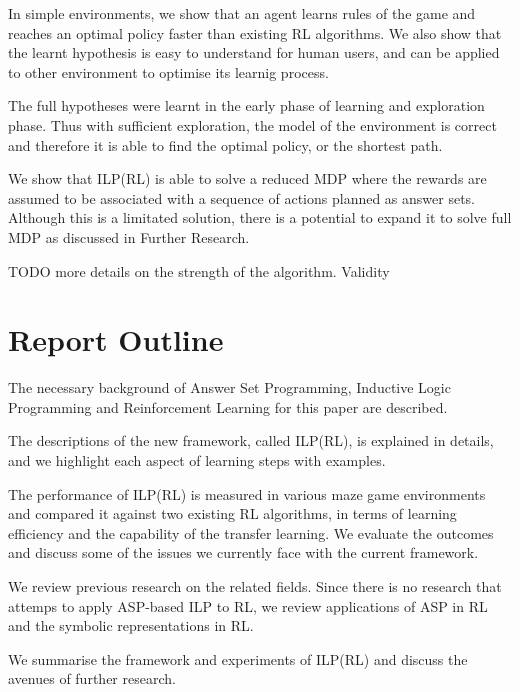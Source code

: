 In simple environments, we show that an agent learns rules of the game and reaches an optimal policy faster than existing RL algorithms.
We also show that the learnt hypothesis is easy to understand for human users, and can be applied to other environment to optimise its learnig process.

The full hypotheses were learnt in the early phase of learning and exploration phase. Thus with sufficient exploration, the model of the environment is correct
and therefore it is able to find the optimal policy, or the shortest path. 

We show that ILP(RL) is able to solve a reduced MDP where the rewards are assumed to be associated with a sequence of actions planned as answer sets.
Although this is a limitated solution, there is a potential to expand it to solve full MDP as discussed in Further Research. 

TODO more details on the strength of the algorithm. 
Validity

\section{Report Outline}
\begin{customthm}{2}
The necessary background of Answer Set Programming, Inductive Logic Programming and Reinforcement Learning for this paper are described.
\end{customthm}

\begin{customthm}{3}
The descriptions of the new framework, called ILP(RL), is explained in details, and we highlight each aspect of learning steps with examples. 
\end{customthm}

\begin{customthm}{4}
The performance of ILP(RL) is measured in various maze game environments and compared it against two existing RL algorithms, in terms of learning efficiency and the capability of the transfer learning.
We evaluate the outcomes and discuss some of the issues we currently face with the current framework.
\end{customthm}

\begin{customthm}{5}
We review previous research on the related fields. Since there is no research that attemps to apply ASP-based ILP to RL, we review  
applications of ASP in RL and the symbolic representations in RL.  
\end{customthm}

\begin{customthm}{6}
We summarise the framework and experiments of ILP(RL) and discuss the avenues of further research. 
\end{customthm}